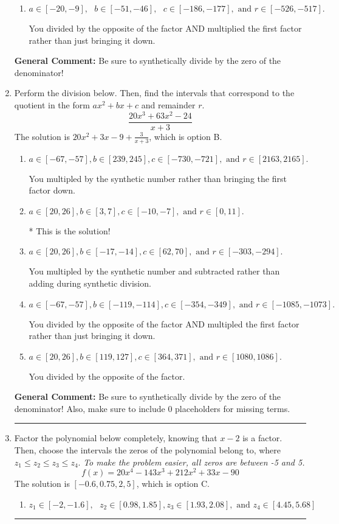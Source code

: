 \documentclass{extbook}[14pt]
\newcommand{\litem}[1]{\item #1

\rule{\textwidth}{0.4pt}}
\begin{document}
\begin{enumerate}
{\begin{enumerate}[label=\Alph*.]
 You divided by the opposite of the factor.
\item \( a \in [-20, -9], \text{   } b \in [-51, -46], \text{   } c \in [-186, -177], \text{   and   } r \in [-526, -517]. \)

 You divided by the opposite of the factor AND multiplied the first factor rather than just bringing it down.
\end{enumerate}

\textbf{General Comment:} Be sure to synthetically divide by the zero of the denominator!
}
\litem{
Perform the division below. Then, find the intervals that correspond to the quotient in the form $ax^2+bx+c$ and remainder $r$.
\[ \frac{20x^{3} +63 x^{2} -24}{x + 3} \]The solution is \( 20x^{2} +3 x -9 + \frac{3}{x + 3} \), which is option B.\begin{enumerate}[label=\Alph*.]
\item \( a \in [-67, -57], b \in [239, 245], c \in [-730, -721], \text{ and } r \in [2163, 2165]. \)

 You multipled by the synthetic number rather than bringing the first factor down.
\item \( a \in [20, 26], b \in [3, 7], c \in [-10, -7], \text{ and } r \in [0, 11]. \)

* This is the solution!
\item \( a \in [20, 26], b \in [-17, -14], c \in [62, 70], \text{ and } r \in [-303, -294]. \)

 You multipled by the synthetic number and subtracted rather than adding during synthetic division.
\item \( a \in [-67, -57], b \in [-119, -114], c \in [-354, -349], \text{ and } r \in [-1085, -1073]. \)

 You divided by the opposite of the factor AND multipled the first factor rather than just bringing it down.
\item \( a \in [20, 26], b \in [119, 127], c \in [364, 371], \text{ and } r \in [1080, 1086]. \)

 You divided by the opposite of the factor.
\end{enumerate}

\textbf{General Comment:} Be sure to synthetically divide by the zero of the denominator! Also, make sure to include 0 placeholders for missing terms.
}
\litem{
Factor the polynomial below completely, knowing that $x -2$ is a factor. Then, choose the intervals the zeros of the polynomial belong to, where $z_1 \leq z_2 \leq z_3 \leq z_4$. \textit{To make the problem easier, all zeros are between -5 and 5.}
\[ f(x) = 20x^{4} -143 x^{3} +212 x^{2} +33 x -90 \]The solution is \( [-0.6, 0.75, 2, 5] \), which is option C.\begin{enumerate}[label=\Alph*.]
\item \( z_1 \in [-2, -1.6], \text{   }  z_2 \in [0.98, 1.85], z_3 \in [1.93, 2.08], \text{   and   } z_4 \in [4.45, 5.68] \)


\end{enumerate}}
\end{enumerate}
\end{document}
